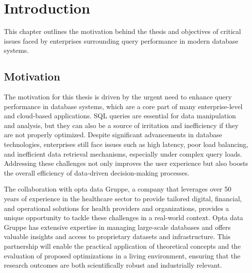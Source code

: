 \section{Introduction}
This chapter outlines the motivation behind the thesis and objectives of critical issues faced by enterprises surrounding query performance in modern database systems.
\subsection{Motivation}
The motivation for this thesis is driven by the urgent need to enhance query performance in database systems, which are a core part of many enterprise-level and cloud-based applications. SQL queries are essential for data manipulation and analysis, but they can also be a source of irritation and inefficiency if they are not properly optimized. Despite significant advancements in database technologies, enterprises still face issues such as high latency, poor load balancing, and inefficient data retrieval mechanisms, especially under complex query loads. Addressing these challenges not only improves the user experience but also boosts the overall efficiency of data-driven decision-making processes.\vspace{.4cm}

The collaboration with opta data Gruppe, a company that leverages over 50 years of experience in the healthcare sector to provide tailored digital, financial, and operational solutions for health providers and organizations, provides a unique opportunity to tackle these challenges in a real-world context. Opta data Gruppe has extensive expertise in managing large-scale databases and offers valuable insights and access to proprietary datasets and infrastructure. This partnership will enable the practical application of theoretical concepts and the evaluation of proposed optimizations in a living environment, ensuring that the research outcomes are both scientifically robust and industrially relevant. \vspace{.4cm}

